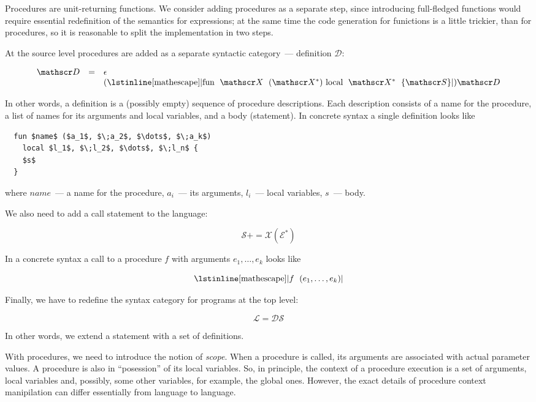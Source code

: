 \documentclass{article}
\newcommand{\llang}[1]{\mbox{\lstinline[mathescape]|#1|}}
\theoremstyle{definition}
\begin{document}
Procedures are unit-returning functions. We consider adding procedures as a separate step, since introducing full-fledged functions would require
essential redefinition of the semantics for expressions; at the same time the code generation for funictions is a little trickier, than for procedures, so
it is reasonable to split the implementation in two steps.

At the source level procedures are added as a separate syntactic category~--- definition $\mathscr D$:

\[
\begin{array}{rcl}
  \mathscr D & = & \epsilon \\
             &   & (\llang{fun $\;\mathscr X\;$ ($\mathscr X^*$) local $\;\mathscr X^*\;$ \{$\mathscr S$\}})\mathscr D
\end{array}
\]

In other words, a definition is a (possibly empty) sequence of procedure descriptions. Each description consists of a name for the procedure, a
list of names for its arguments and local variables, and a body (statement). In concrete syntax a single definition looks like

\begin{lstlisting}
  fun $name$ ($a_1$, $\;a_2$, $\dots$, $\;a_k$)
    local $l_1$, $\;l_2$, $\dots$, $\;l_n$ {
    $s$
  }  
\end{lstlisting}

where $name$~--- a name for the procedure, $a_i$~--- its arguments, $l_i$~--- local variables, $s$~--- body.

We also need to add a call statement to the language:

\[
\mathscr S += \mathscr X (\mathscr E^*)
\]

In a concrete syntax a call to a procedure $f$ with arguments $e_1,\dots,e_k$ looks like

\[
  \llang{$f\;$ ($e_1,\dots,e_k$)}
\]

Finally, we have to redefine the syntax category for programs at the top level:

\[
\mathscr L = \mathscr D\mathscr S
\]

In other words, we extend a statement with a set of definitions.

With procedures, we need to introduce the notion of \emph{scope}. When a procedure is called, its arguments
are associated with actual parameter values. A procedure is also in ``posession'' of its local variables.
So, in principle, the context of a procedure execution is a set of arguments, local variables and, possibly, some
other variables, for example, the global ones. However, the exact details of procedure context manipilation can
differ essentially from language to language.
\end{document}
